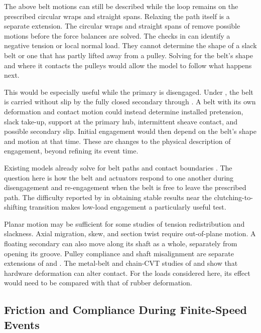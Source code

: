 \documentclass[11pt]{report}
\numberwithin{equation}{section}
\newcounter{assump}
\begin{document}
The above belt motions can still be described while the loop remains on the
prescribed circular wraps and straight spans. Relaxing the path itself is a
separate extension. The circular wraps and straight spans of
 remove possible motions before the force
balances are solved. The checks in
 can identify a negative tension or local
normal load. They cannot determine the shape of a slack belt or one that has
partly lifted away from a pulley. Solving for the belt's shape and where it
contacts the pulleys would allow the model to follow what happens next.

This would be especially useful while the primary is disengaged. Under
, the belt is carried without slip by the
fully closed secondary through . A belt with
its own deformation and contact motion could instead determine installed
pretension, slack take-up, support at the primary hub, intermittent sheave
contact, and possible secondary slip. Initial engagement would then depend on
the belt's shape and motion at that time. These are changes to the physical
description of engagement, beyond refining its event time.

Existing models already solve for belt paths and contact boundaries
\citep{KongParker2005,KongParker2006,JulioPlante2011}. The question here is
how the belt and actuators respond to one another during disengagement and
re-engagement when the belt is free to leave the prescribed path. The
difficulty reported by \citet{JulioPlante2011} in obtaining stable results
near the clutching-to-shifting transition makes low-load engagement a
particularly useful test.

Planar motion may be sufficient for some studies of tension redistribution and
slackness. Axial migration, skew, and section twist require out-of-plane
motion. A floating secondary can also move along its shaft as a whole,
separately from opening its groove. Pulley compliance and shaft misalignment
are separate extensions of  and
. The metal-belt and chain-CVT studies of
\citet{CarboneMangialardiMantriota2005} and \citet{DuanEtAl2016} show that
hardware deformation can alter contact. For the loads considered here, its
effect would need to be compared with that of rubber deformation.

\subsection*{Friction and Compliance During Finite-Speed Events}
\label{sec:future_work_events}
\end{document}
